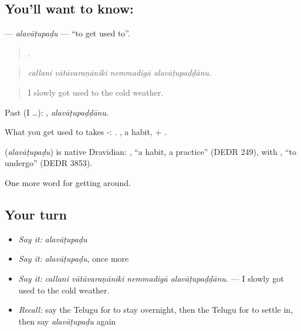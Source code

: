 \subsection*{You'll want to know: }
\textbf{} — \emph{alavāṭupaḍu} — \textquotedblleft{}to get used to\textquotedblright{}.

\begin{quote}
   .
\end{quote}

\begin{quote}
\emph{callani vātāvaraṇāniki nemmadigā alavāṭupaḍḍānu.}
\end{quote}

\begin{quote}
I slowly got used to the cold weather.
\end{quote}

Past (I …): , \emph{alavāṭupaḍḍānu}.

What you get used to takes -: . , a habit, + .

\begin{cousinweb}
\textbf{} (\emph{alavāṭupaḍu}) is native Dravidian: , \textquotedblleft{}a habit, a practice\textquotedblright{} (DEDR 249), with , \textquotedblleft{}to undergo\textquotedblright{} (DEDR 3853).
\end{cousinweb}

\begin{grammarlens}[title={What you've built}]
One more word for getting around.
\end{grammarlens}

\subsection*{Your turn}
\begin{itemize}
\raggedright
  \item \emph{Say it:} \emph{alavāṭupaḍu}
  \item \emph{Say it:} \emph{alavāṭupaḍu}, once more
  \item \emph{Say it:} \emph{callani vātāvaraṇāniki nemmadigā alavāṭupaḍḍānu.} — I slowly got used to the cold weather.
  \item \emph{Recall:} say the Telugu for to stay overnight, then the Telugu for to settle in, then say \emph{alavāṭupaḍu} again
\end{itemize}

